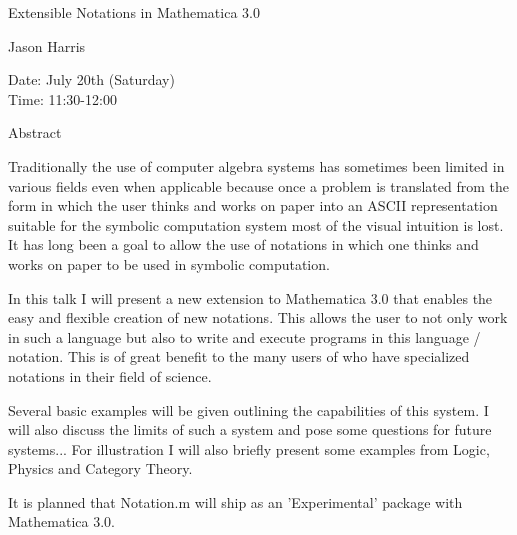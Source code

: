 \begin{center}
\LARGE
Extensible Notations in Mathematica 3.0

\end{center}

\begin{center}
\Large
Jason Harris
\end{center}

\noindent
Date:  July 20th (Saturday)\\
Time: 11:30-12:00\\

\begin{center}
\large
Abstract
\end{center}



Traditionally the use of computer algebra systems has sometimes been
limited in various fields even when applicable because once a problem is
translated from the form in which the user thinks and works on paper into
an ASCII representation suitable for the symbolic computation system most
of the visual intuition is lost. It has long been a goal to allow the use
of notations in which one thinks and works on paper to be used in symbolic
computation.

In this talk I will present a new extension to Mathematica 3.0 that enables
the easy and flexible creation of new notations.  This allows the user to
not only work in such a language but also to write and execute programs in
this language / notation. This is of great benefit to the many users of who
have specialized notations in their field of science.

Several basic examples will be given outlining the capabilities of this
system. I will also discuss the limits of such a system and pose some
questions for future systems... For illustration I will also briefly
present some examples from Logic, Physics and Category Theory.

It is planned that Notation.m will ship as an 'Experimental' package with
Mathematica 3.0.
